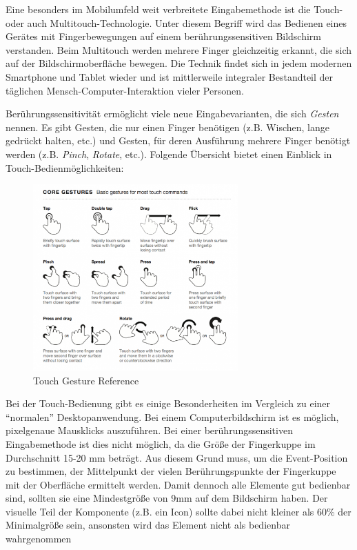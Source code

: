 Eine besonders im Mobilumfeld weit verbreitete Eingabemethode ist die Touch- oder auch Multitouch-Technologie. Unter diesem Begriff wird das Bedienen eines Gerätes mit Fingerbewegungen auf einem berührungssensitiven Bildschirm verstanden. Beim Multitouch werden mehrere Finger gleichzeitig erkannt, die sich auf der Bildschirmoberfläche bewegen. Die Technik findet sich in jedem modernen Smartphone und Tablet wieder und ist mittlerweile integraler Bestandteil der täglichen Mensch-Computer-Interaktion vieler Personen.\par
Berührungssensitivität ermöglicht viele neue Eingabevarianten, die sich \textit{Gesten} nennen. Es gibt Gesten, die nur einen Finger benötigen (z.B. Wischen, lange gedrückt halten, etc.) und Gesten, für deren Ausführung mehrere Finger benötigt werden (z.B. \textit{Pinch}, \textit{Rotate}, etc.). Folgende Übersicht bietet einen Einblick in Touch-Bedienmöglichkeiten:
\begin{figure}[H]
 \centering
 \includegraphics[width=0.7\textwidth]{grafiken/touchgestures.png}
 \caption{Touch Gesture Reference \cite{touchgestures2010}}
 \label{fig:touchGestures}
\end{figure}
Bei der Touch-Bedienung gibt es einige Besonderheiten im Vergleich zu einer \enquote{normalen} Desktopanwendung. Bei einem Computerbildschirm ist es möglich, pixelgenaue Mausklicks auszuführen. Bei einer berührungssensitiven Eingabemethode ist dies nicht möglich, da die Größe der Fingerkuppe im Durchschnitt 15-20 mm beträgt. Aus diesem Grund muss, um die Event-Position zu bestimmen, der Mittelpunkt der vielen Berührungspunkte der Fingerkuppe mit der Oberfläche ermittelt werden. Damit dennoch alle Elemente gut bedienbar sind, sollten sie eine Mindestgröße von 9mm auf dem Bildschirm haben. Der visuelle Teil der Komponente (z.B. ein Icon) sollte dabei nicht kleiner als 60\% der Minimalgröße sein, ansonsten wird das Element nicht als bedienbar wahrgenommen \cite[S. 136]{Ullenboom2014}
